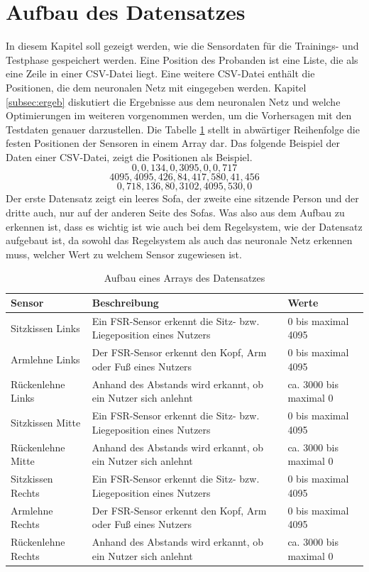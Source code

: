 \section{Aufbau des Datensatzes}
\label{sec:dataset}
In diesem Kapitel soll gezeigt werden, wie die Sensordaten für die Trainings- und Testphase gespeichert werden. Eine Position des Probanden ist eine Liste, die als eine Zeile in einer CSV-Datei liegt. Eine weitere CSV-Datei enthält die Positionen, die dem neuronalen Netz mit eingegeben werden. Kapitel \ref{subsec:ergeb} diskutiert die Ergebnisse aus dem neuronalen Netz und welche Optimierungen im weiteren vorgenommen werden, um die Vorhersagen mit den Testdaten genauer darzustellen. Die Tabelle \ref{tab:tablearr} stellt in abwärtiger Reihenfolge die festen Positionen der Sensoren in einem Array dar. Das folgende Beispiel der Daten einer CSV-Datei, zeigt die Positionen als Beispiel.
\newpage
\[0, 0, 134, 0, 3095, 0, 0, 717\]  
\[4095, 4095, 426, 84, 417, 580, 41, 456\]
\[0, 718, 136, 80, 3102, 4095, 530, 0\]
\newline
Der erste Datensatz zeigt ein leeres Sofa, der zweite eine sitzende Person und der dritte auch, nur auf der anderen Seite des Sofas. Was also aus dem Aufbau zu erkennen ist, dass es wichtig ist wie auch bei dem Regelsystem, wie der Datensatz aufgebaut ist, da sowohl das Regelsystem als auch das neuronale Netz erkennen muss, welcher Wert zu welchem Sensor zugewiesen ist.

\begin{table}[H]
	\centering
	\caption[Aufbau eines Arrays des Datensatzes]{Aufbau eines Arrays des Datensatzes}
		\vspace{1.0em}	
	\begin{tabular}{| l | p{5cm} | l | }
		\hline
		\rowcolor[gray]{0.9}\textbf{Sensor} & \textbf{Beschreibung} & \textbf{Werte} \\
		\hline
		\hline
		Sitzkissen Links & Ein FSR-Sensor erkennt die Sitz- bzw. Liegeposition eines Nutzers & 0 bis maximal 4095\\
		\hline
		Armlehne Links & Der FSR-Sensor erkennt den Kopf, Arm oder Fuß eines Nutzers & 0 bis maximal 4095\\
		\hline
		Rückenlehne Links & Anhand des Abstands wird erkannt, ob ein Nutzer sich anlehnt & ca. 3000 bis maximal 0 \\
		\hline
		Sitzkissen Mitte & Ein FSR-Sensor erkennt die Sitz- bzw. Liegeposition eines Nutzers & 0 bis maximal 4095\\
		\hline
		Rückenlehne Mitte & Anhand des Abstands wird erkannt, ob ein Nutzer sich anlehnt & ca. 3000 bis maximal 0\\
		\hline
		Sitzkissen Rechts & Ein FSR-Sensor erkennt die Sitz- bzw. Liegeposition eines Nutzers & 0 bis maximal 4095\\
		\hline
		Armlehne Rechts & Der FSR-Sensor erkennt den Kopf, Arm oder Fuß eines Nutzers & 0 bis maximal 4095\\
		\hline
		Rückenlehne Rechts & Anhand des Abstands wird erkannt, ob ein Nutzer sich anlehnt & ca. 3000 bis maximal 0\\ 
		\hline
	\end{tabular}
	\label{tab:tablearr}
\end{table}
\newpage

